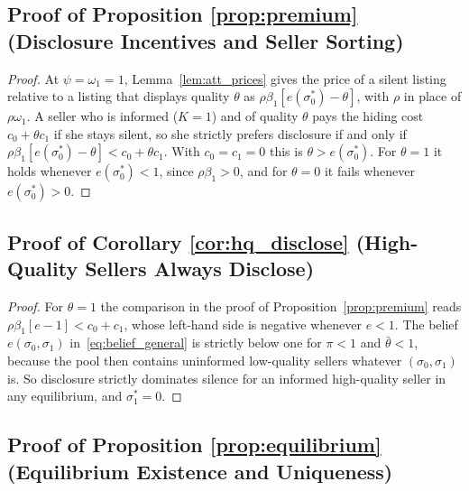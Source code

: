 \documentclass[10pt,letterpaper]{bp-template-concise}
\begin{document}
\subsection*{Proof of Proposition \ref{prop:premium} (Disclosure Incentives and Seller Sorting)}

\begin{proof}
At $\psi=\omega_1=1$, Lemma~\ref{lem:att_prices} gives the price of a silent listing relative to a listing that displays quality $\theta$ as $\rho\beta_1[e(\sigma_0^*)-\theta]$, with $\rho$ in place of $\rho\omega_1$. A seller who is informed ($K=1$) and of quality $\theta$ pays the hiding cost $c_0+\theta c_1$ if she stays silent, so she strictly prefers disclosure if and only if $\rho\beta_1[e(\sigma_0^*)-\theta]<c_0+\theta c_1$. With $c_0=c_1=0$ this is $\theta>e(\sigma_0^*)$. For $\theta=1$ it holds whenever $e(\sigma_0^*)<1$, since $\rho\beta_1>0$, and for $\theta=0$ it fails whenever $e(\sigma_0^*)>0$.
\end{proof}

\subsection*{Proof of Corollary \ref{cor:hq_disclose} (High-Quality Sellers Always Disclose)}

\begin{proof}
For $\theta=1$ the comparison in the proof of Proposition~\ref{prop:premium} reads $\rho\beta_1[e-1]<c_0+c_1$, whose left-hand side is negative whenever $e<1$. The belief $e(\sigma_0,\sigma_1)$ in~\eqref{eq:belief_general} is strictly below one for $\pi<1$ and $\bar\theta<1$, because the pool then contains uninformed low-quality sellers whatever $(\sigma_0,\sigma_1)$ is. So disclosure strictly dominates silence for an informed high-quality seller in any equilibrium, and $\sigma_1^*=0$.
\end{proof}

\subsection*{Proof of Proposition \ref{prop:equilibrium} (Equilibrium Existence and Uniqueness)}
\end{document}
